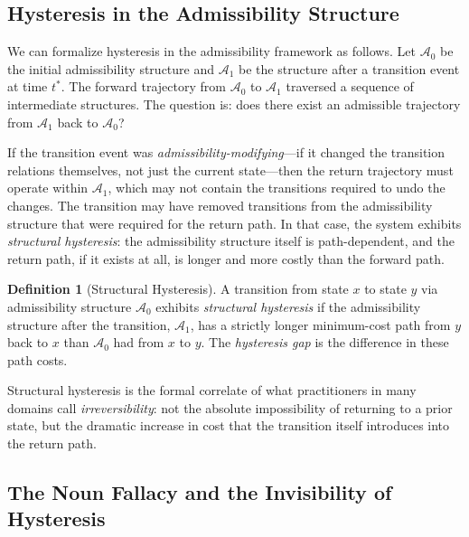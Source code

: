 \documentclass[12pt, a4paper]{article}
\theoremstyle{plain}
\theoremstyle{definition}
\newtheorem{definition}[theorem]{Definition}
\theoremstyle{remark}
\begin{document}
\subsection{Hysteresis in the Admissibility Structure}

We can formalize hysteresis in the admissibility framework as follows.
Let $\mathcal{A}_0$ be the initial admissibility structure and
$\mathcal{A}_1$ be the structure after a transition event at time $t^*$.
The forward trajectory from $\mathcal{A}_0$ to $\mathcal{A}_1$ traversed
a sequence of intermediate structures. The question is: does there exist an
admissible trajectory from $\mathcal{A}_1$ back to $\mathcal{A}_0$?

If the transition event was \emph{admissibility-modifying}---if it changed
the transition relations themselves, not just the current state---then
the return trajectory must operate within $\mathcal{A}_1$, which may not
contain the transitions required to undo the changes. The transition may
have removed transitions from the admissibility structure that were required
for the return path. In that case, the system exhibits \emph{structural
hysteresis}: the admissibility structure itself is path-dependent, and the
return path, if it exists at all, is longer and more costly than the forward path.

\begin{definition}[Structural Hysteresis]
A transition from state $x$ to state $y$ via admissibility structure
$\mathcal{A}_0$ exhibits \emph{structural hysteresis} if the admissibility
structure after the transition, $\mathcal{A}_1$, has a strictly longer
minimum-cost path from $y$ back to $x$ than $\mathcal{A}_0$ had from $x$
to $y$. The \emph{hysteresis gap} is the difference in these path costs.
\end{definition}

Structural hysteresis is the formal correlate of what practitioners in many
domains call \emph{irreversibility}: not the absolute impossibility of
returning to a prior state, but the dramatic increase in cost that the
transition itself introduces into the return path.

\subsection{The Noun Fallacy and the Invisibility of Hysteresis}
\end{document}
